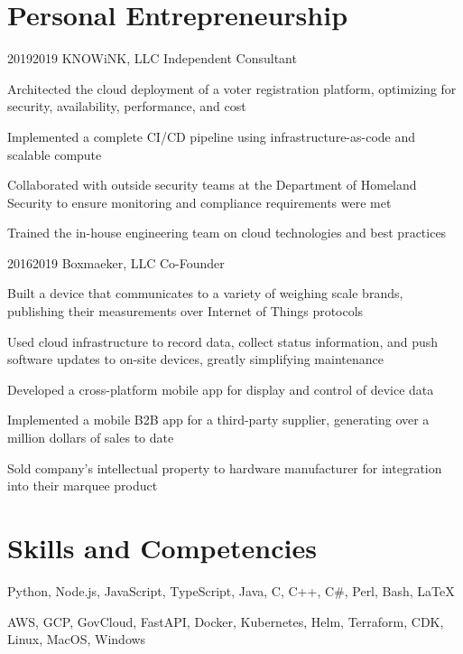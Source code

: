 \documentclass{article}
\begin{document}
\section{Personal Entrepreneurship}

\job
  {2019}{2019}
  {KNOWiNK, LLC}
  {Independent Consultant}
  {\begin{achievements}
    \item Architected the cloud deployment of a voter registration platform, optimizing for security, availability, performance, and cost
    \item Implemented a complete CI/CD pipeline using infrastructure-as-code and scalable compute
    \item Collaborated with outside security teams at the Department of Homeland Security to ensure monitoring and compliance requirements were met
    \item Trained the in-house engineering team on cloud technologies and best practices
  \end{achievements}}

\job
  {2016}{2019}
  {Boxmaeker, LLC}
  {Co-Founder}
  {\begin{achievements}
    \item Built a device that communicates to a variety of weighing scale brands, publishing their measurements over Internet of Things protocols
    \item Used cloud infrastructure to record data, collect status information, and push software updates to on-site devices, greatly simplifying maintenance
    \item Developed a cross-platform mobile app for display and control of device data
    \item Implemented a mobile B2B app for a third-party supplier, generating over a million dollars of sales to date
    \item Sold company's intellectual property to hardware manufacturer for integration into their marquee product
  \end{achievements}}


\section{Skills and Competencies}

  {Python, Node.js, JavaScript, TypeScript, Java, C, C++, C\#, Perl, Bash, LaTeX}

  {AWS, GCP, GovCloud, FastAPI, Docker, Kubernetes, Helm, Terraform, CDK, Linux, MacOS, Windows}
\end{document}
